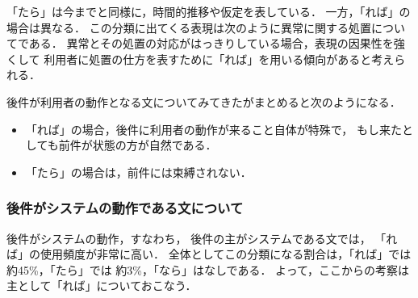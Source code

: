 \begin{enumerate}
「たら」は今までと同様に，時間的推移や仮定を表している．
一方，「れば」の場合は異なる．
この分類に出てくる表現は次のように異常に関する処置についてである．
異常とその処置の対応がはっきりしている場合，表現の因果性を強くして
利用者に処置の仕方を表すために「れば」を用いる傾向があると考えられる．
\end{enumerate}

後件が利用者の動作となる文についてみてきたがまとめると次のようになる．
\begin{itemize}
\item 「れば」の場合，後件に利用者の動作が来ること自体が特殊で，
もし来たとしても前件が状態の方が自然である．
\item 「たら」の場合は，前件には束縛されない．
\end{itemize}

\subsubsection{後件がシステムの動作である文について}
後件がシステムの動作，すなわち，
後件の{\dg 主}がシステムである文では，
「れば」の使用頻度が非常に高い．
全体としてこの分類になる割合は，「れば」では約45\%，「たら」では
約3\%，「なら」はなしである．
よって，ここからの考察は主として「れば」についておこなう．

